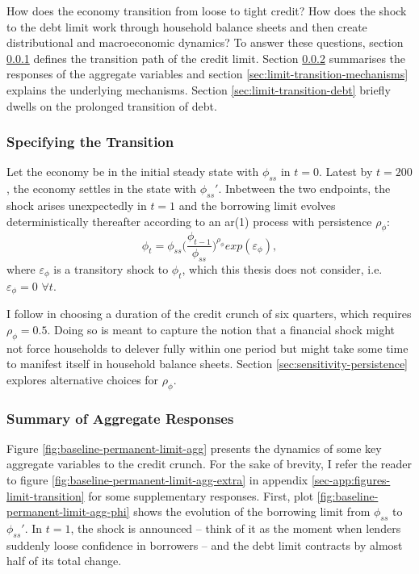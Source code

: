 \documentclass[a4paper,12pt]{article} %
\numberwithin{equation}{section} %
\numberwithin{figure}{section}
\numberwithin{table}{section}
\begin{document}
How does the economy transition from loose to tight credit? How does the shock to the debt limit work through household balance sheets and then create distributional and macroeconomic dynamics? To answer these questions, section \ref{sec:limit-transition-specific} defines the transition path of the credit limit. Section \ref{sec:limit-transition-summ} summarises the responses of the aggregate variables and section \ref{sec:limit-transition-mechanisms} explains the underlying mechanisms. Section \ref{sec:limit-transition-debt} briefly dwells on the prolonged transition of debt.

\subsubsection{Specifying the Transition}
\label{sec:limit-transition-specific}

Let the economy be in the initial steady state with $\phi_{ss}$ in $t=0$. Latest by $t=200$, the economy settles in the state with $\phi_{ss}'$. Inbetween the two endpoints, the shock arises unexpectedly in $t=1$ and the borrowing limit evolves deterministically thereafter according to an \Gls{ar}(1) process with persistence $\rho_{\phi}$:
\begin{equation}
    \phi_t = \phi_{ss} \Bigg( \frac{\phi_{t-1}}{\phi_{ss}} \Bigg)^{\rho_{\phi}} exp(\varepsilon_{\phi}), \label{eq:borrowing-limit-process}
\end{equation}
where $\varepsilon_{\phi}$ is a transitory shock to $\phi_t$, which this thesis does not consider, i.e.~$\varepsilon_{\phi} = 0$ $\forall t$. 

I follow \textcite{gl2017} in choosing a duration of the credit crunch of six quarters, which requires $\rho_{\phi} = 0.5$. Doing so is meant to capture the notion that a financial shock might not force households to delever fully within one period but might take some time to manifest itself in household balance sheets. Section \ref{sec:sensitivity-persistence} explores alternative choices for $\rho_{\phi}$.

\subsubsection{Summary of Aggregate Responses}
\label{sec:limit-transition-summ}

Figure \ref{fig:baseline-permanent-limit-agg} presents the dynamics of some key aggregate variables to the credit crunch. For the sake of brevity, I refer the reader to figure \ref{fig:baseline-permanent-limit-agg-extra} in appendix \ref{sec-app:figures-limit-transition} for some supplementary responses. First, plot \ref{fig:baseline-permanent-limit-agg-phi} shows the evolution of the borrowing limit from $\phi_{ss}$ to $\phi_{ss}'$. In $t=1$, the shock is announced -- think of it as the moment when lenders suddenly loose confidence in borrowers -- and the debt limit contracts by almost half of its total change.
\end{document}
